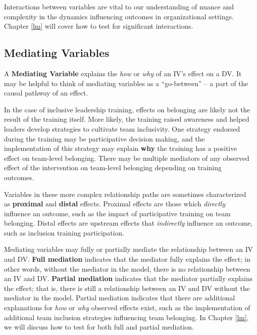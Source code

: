 \documentclass[]{book}
\begin{document}
Interactions between variables are vital to our understanding of nuance and complexity in the dynamics influencing outcomes in organizational settings. Chapter \ref{lm} will cover how to test for significant interactions.

\hypertarget{mediating-variables}{%
\subsection{Mediating Variables}\label{mediating-variables}}

A \textbf{Mediating Variable} explains the \emph{how} or \emph{why} of an IV's effect on a DV. It may be helpful to think of mediating variables as a ``go-between'' -- a part of the causal pathway of an effect.

In the case of inclusive leadership training, effects on belonging are likely not the result of the training itself. More likely, the training raised awareness and helped leaders develop strategies to cultivate team inclusivity. One strategy endorsed during the training may be participative decision making, and the implementation of this strategy may explain \textbf{why} the training has a positive effect on team-level belonging. There may be multiple mediators of any observed effect of the intervention on team-level belonging depending on training outcomes.

Variables in these more complex relationship paths are sometimes characterized as \textbf{proximal} and \textbf{distal} effects. Proximal effects are those which \emph{directly} influence an outcome, such as the impact of participative training on team belonging. Distal effects are upstream effects that \emph{indirectly} influence an outcome, such as inclusion training participation.

Mediating variables may fully or partially mediate the relationship between an IV and DV. \textbf{Full mediation} indicates that the mediator fully explains the effect; in other words, without the mediator in the model, there is no relationship between an IV and DV. \textbf{Partial mediation} indicates that the mediator partially explains the effect; that is, there is still a relationship between an IV and DV without the mediator in the model. Partial mediation indicates that there are additional explanations for \emph{how} or \emph{why} observed effects exist, such as the implementation of additional team inclusion strategies influencing team belonging. In Chapter \ref{lm}, we will discuss how to test for both full and partial mediation.
\end{document}
